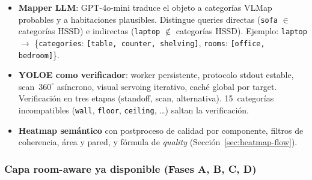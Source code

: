 \documentclass[11pt,a4paper]{article}
\begin{document}
\begin{itemize}
  \item[\checkmark] \textbf{Mapper LLM}: GPT-4o-mini traduce el objeto a
        categorías VLMap probables y a habitaciones plausibles. Distingue
        queries directas (\texttt{sofa} $\in$ categorías HSSD) e indirectas
        (\texttt{laptop} $\notin$ categorías HSSD). Ejemplo:
        \texttt{laptop} $\rightarrow$
        \{\texttt{categories}: \texttt{[table, counter, shelving]},
        \texttt{rooms}: \texttt{[office, bedroom]}\}.
  \item[\checkmark] \textbf{YOLOE como verificador}: worker persistente,
        protocolo stdout estable, scan~$360^\circ$ asíncrono, visual servoing
        iterativo, caché global por target. Verificación en tres etapas
        (standoff, scan, alternativa). 15~categorías incompatibles
        (\texttt{wall}, \texttt{floor}, \texttt{ceiling}, \ldots) saltan la
        verificación.
  \item[\checkmark] \textbf{Heatmap semántico} con postproceso de calidad por
        componente, filtros de coherencia, área y pared, y fórmula de
        \textit{quality} (Sección~\ref{sec:heatmap-flow}).
\end{itemize}

\subsubsection*{Capa room-aware ya disponible (Fases A, B, C, D)}
\end{document}
